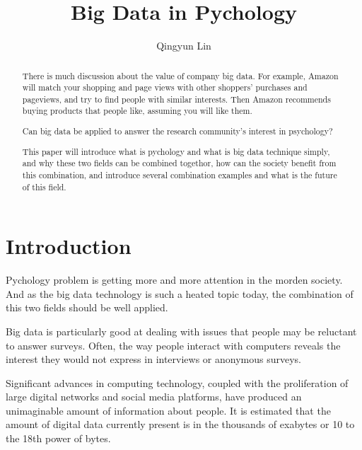 
\title{Big Data in Pychology}


\author{Qingyun Lin}


\renewcommand{\shortauthors}{G. v. Laszewski}


\begin{abstract}
There is much discussion about the value of company big data. 
For example, Amazon will match your shopping and page views with 
other shoppers’ purchases and pageviews, and try to find people with 
similar interests. Then Amazon recommends buying products that people 
like, assuming you will like them.

Can big data be applied to answer the research community’s interest 
in psychology?

This paper will introduce what is pychology and what is big data 
technique simply, and why these two fields can be combined togethor, 
how can the society benefit from this combination, and introduce 
several combination examples and what is the future of this field.
\end{abstract}



\maketitle

\section{Introduction}

Pychology problem is getting more and more attention in the morden 
society. And as the big data technology is such a heated topic today, 
the combination of this two fields should be well applied.

Big data is particularly good at dealing with issues that people may 
be reluctant to answer surveys. Often, the way people interact with 
computers reveals the interest they would not express in interviews 
or anonymous surveys.

Significant advances in computing technology, coupled with the 
proliferation of large digital networks and social media platforms, 
have produced an unimaginable amount of information about people. 
It is estimated that the amount of digital data currently present is 
in the thousands of exabytes or 10 to the 18th power of bytes.

